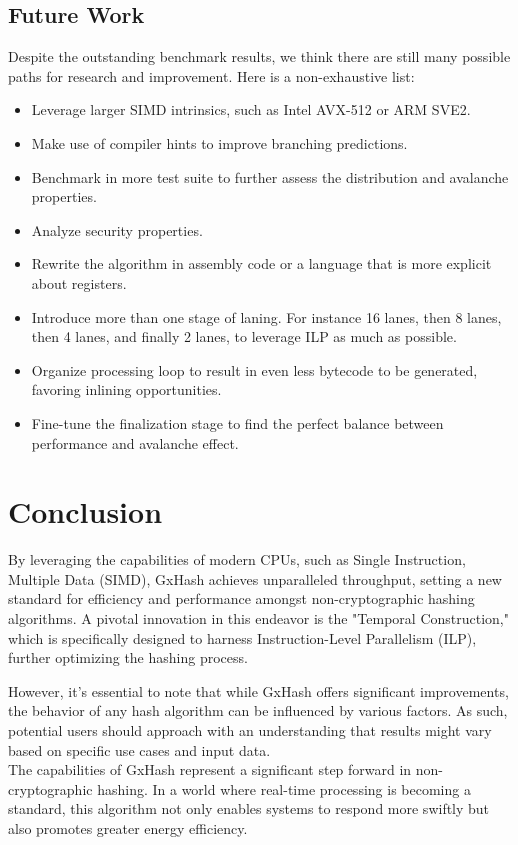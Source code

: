 \documentclass[10pt]{article}
\begin{document}
\subsection{Future Work}
Despite the outstanding benchmark results, we think there are still many possible paths for research and improvement. Here is a non-exhaustive list:
\begin{itemize}
    \item Leverage larger SIMD intrinsics, such as Intel AVX-512 or ARM SVE2.
    \item Make use of compiler hints to improve branching predictions.
    \item Benchmark in more test suite to further assess the distribution and avalanche properties.
    \item Analyze security properties.
    \item Rewrite the algorithm in assembly code or a language that is more explicit about registers.
    \item Introduce more than one stage of laning. For instance 16 lanes, then 8 lanes, then 4 lanes, and finally 2 lanes, to leverage ILP as much as possible.
    \item Organize processing loop to result in even less bytecode to be generated, favoring inlining opportunities.
    \item Fine-tune the finalization stage to find the perfect balance between performance and avalanche effect.
\end{itemize}

\clearpage
\section{Conclusion}

By leveraging the capabilities of modern CPUs, such as Single Instruction, Multiple Data (SIMD), GxHash achieves unparalleled throughput, setting a new standard for efficiency and performance amongst non-cryptographic hashing algorithms. A pivotal innovation in this endeavor is the "Temporal Construction," which is specifically designed to harness Instruction-Level Parallelism (ILP), further optimizing the hashing process.

However, it's essential to note that while GxHash offers significant improvements, the behavior of any hash algorithm can be influenced by various factors. As such, potential users should approach with an understanding that results might vary based on specific use cases and input data.\\

The capabilities of GxHash represent a significant step forward in non-cryptographic hashing. In a world where real-time processing is becoming a standard, this algorithm not only enables systems to respond more swiftly but also promotes greater energy efficiency.



\end{document}
